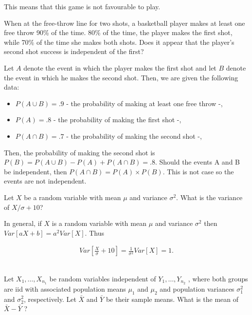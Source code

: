 \documentclass{homework}
\begin{document}
This means that this game is not favourable to play. \\

\begin{tcolorbox}[title=Question 14]
When at the free-throw line for two shots, a basketball player makes at least one free throw 90\% of the time. 80\% of the time, the player makes the first shot, while 70\% of the time she makes both shots. Does it appear that the player's second shot success is independent of the first?
\end{tcolorbox}

Let $A$ denote the event in which the player makes the first shot and let $B$ denote the event in which he makes the second shot. Then, we are given the following data:

\begin{itemize}
    \item $P(A \cup B) = .9$ - the probability of making at least one free throw -,
    \item $P(A) = .8$ - the probability of making the first shot -, 
    \item $P(A\cap B) = .7$ - the probability of making the second shot -,
\end{itemize}

Then, the probability of making the second shot is $P(B)= P(A \cup B) - P(A) + P(A \cap B) = .8$. Should the events A and B be independent, then $P(A\cap B) = P(A) \times P(B)$. This is not case so the events are not independent.\\

\begin{tcolorbox}[title=Question 15]
Let $X$ be a random variable with mean $\mu$ and variance $\sigma^2$. What is the variance of $X/\sigma + 10$?
\end{tcolorbox}

In general, if $X$ is a random variable with mean $\mu$ and variance $\sigma^2$ then $Var[aX+b]=a^2Var[X]$. Thus

\begin{align*}
    Var\left[\frac{X}{\sigma}+10\right] = \frac{1}{\sigma^2} Var[X] = 1. 
\end{align*}\\

\begin{tcolorbox}[title=Question 16]
Let $X_1,\ldots, X_{n_1}$ be random variables independent of $Y_1,\ldots, Y_{n_2}$ , where both groups are iid with associated population means $\mu_1$ and $\mu_2$ and population variances $\sigma_1^2$ and $\sigma_2^2$, respectively. Let $\bar X$ and $\bar Y$ be their sample means. What is the mean of $\bar X - \bar Y$ ?
\end{tcolorbox}
\end{document}
